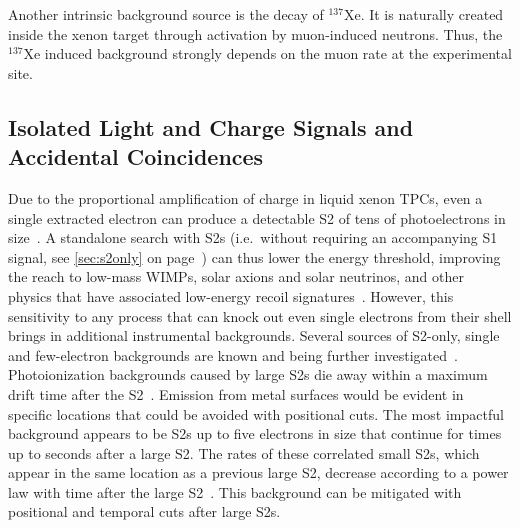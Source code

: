 Another intrinsic background source is the decay of $^{137}$Xe. It is naturally created inside the xenon target through activation by muon-induced neutrons. Thus, the $^{137}$Xe induced background strongly depends on the muon rate at the experimental site.

\subsection{Isolated Light and Charge Signals and Accidental Coincidences} 

Due to the proportional amplification of charge in liquid xenon TPCs, even a single extracted electron can produce a detectable S2 of tens of photoelectrons in size~\cite{Burenkov:2009zz,Santos:2011ju,Angle:2011th,Aprile:2013blg,Edwards:2017emx,Xu:2019dqb}. A standalone search with S2s (i.e.~without requiring an accompanying S1 signal, see \autoref{sec:s2only} on page~\pageref{sec:s2only}) can thus lower the energy threshold, improving the reach to low-mass WIMPs, solar axions and solar neutrinos, and other physics that have associated low-energy recoil signatures~\cite{Aprile:2019xxb}. However, this sensitivity to any process that can knock out even single electrons from their shell brings in additional instrumental backgrounds. Several sources of S2-only, single and few-electron backgrounds are known and being further investigated~\cite{Akerib:2020jud, Kopec:2021ccm, Bodnia:2021flk, Akimov:2016rbs, Aprile:2013blg, Sorensen:2017kpl, Sorensen:2017ymt}. Photoionization backgrounds caused by large S2s die away within a maximum drift time after the S2~\cite{Aprile:2013blg}. Emission from metal surfaces would be evident in specific locations that could be avoided with positional cuts. The most impactful background appears to be S2s up to five electrons in size that continue for times up to seconds after a large S2. The rates of these correlated small S2s, which appear in the same location as a previous large S2, decrease according to a power law with time after the large S2~\cite{Kopec:2021ccm}. This background can be mitigated with positional and temporal cuts after large S2s.

